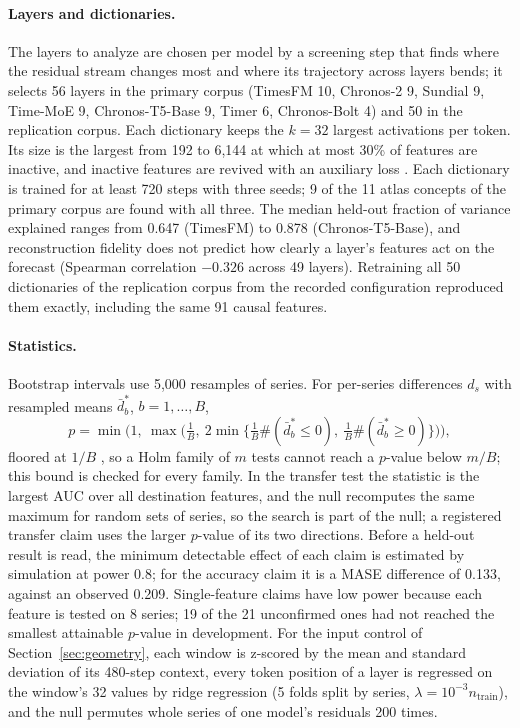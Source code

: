 \documentclass[twoside,11pt]{article}
\begin{document}
\paragraph{Layers and dictionaries.}
The layers to analyze are chosen per model by a screening step that finds where the residual stream changes most and where its trajectory across layers bends; it selects 56 layers in the primary corpus (TimesFM 10, Chronos-2 9, Sundial 9, Time-MoE 9, Chronos-T5-Base 9, Timer 6, Chronos-Bolt 4) and 50 in the replication corpus.
Each dictionary keeps the $k=32$ largest activations per token.
Its size is the largest from 192 to 6{,}144 at which at most 30\% of features are inactive, and inactive features are revived with an auxiliary loss \citep{gao2025topk}.
Each dictionary is trained for at least 720 steps with three seeds; 9 of the 11 atlas concepts of the primary corpus are found with all three.
The median held-out fraction of variance explained ranges from 0.647 (TimesFM) to 0.878 (Chronos-T5-Base), and reconstruction fidelity does not predict how clearly a layer's features act on the forecast (Spearman correlation $-0.326$ across 49 layers).
Retraining all 50 dictionaries of the replication corpus from the recorded configuration reproduced them exactly, including the same 91 causal features.

\paragraph{Statistics.}
Bootstrap intervals use 5{,}000 resamples of series.
For per-series differences $d_s$ with resampled means $\bar d^*_b$, $b=1,\dots,B$,
\begin{equation}
p=\min\Big(1,\ \max\big(\tfrac1B,\ 2\min\{\tfrac1B\#(\bar d^*_b\le 0),\ \tfrac1B\#(\bar d^*_b\ge 0)\}\big)\Big),
\end{equation}
floored at $1/B$ \citep{phipson2010permutation}, so a Holm family of $m$ tests cannot reach a $p$-value below $m/B$; this bound is checked for every family.
In the transfer test the statistic is the largest AUC over all destination features, and the null recomputes the same maximum for random sets of series, so the search is part of the null; a registered transfer claim uses the larger $p$-value of its two directions.
Before a held-out result is read, the minimum detectable effect of each claim is estimated by simulation at power 0.8; for the accuracy claim it is a MASE difference of 0.133, against an observed 0.209.
Single-feature claims have low power because each feature is tested on 8 series; 19 of the 21 unconfirmed ones had not reached the smallest attainable $p$-value in development.
For the input control of Section~\ref{sec:geometry}, each window is z-scored by the mean and standard deviation of its 480-step context, every token position of a layer is regressed on the window's 32 values by ridge regression (5 folds split by series, $\lambda=10^{-3}n_{\mathrm{train}}$), and the null permutes whole series of one model's residuals 200 times.
\end{document}
